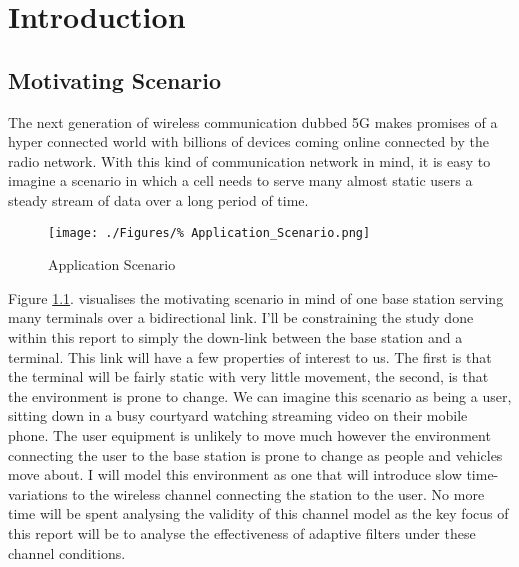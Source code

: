 \chapter{Introduction}
\label{ch:Introduction}
\section{Motivating Scenario}
\label{sec:MotivatingScenario}
The next generation of wireless communication %
dubbed 5G makes promises of a hyper connected %
world with billions of devices coming online %
connected by the radio network. With this kind %
of communication network in mind, it is easy %
to imagine a scenario in which a cell needs %
to serve many almost static users a steady stream %
of data over a long period of time.%

\begin{figure}[h!]
	\texttt{[image: ./Figures/\%
	Application\_Scenario.png]}
	\caption{Application Scenario}
	\label{fig:AppScene}
\end{figure}

Figure \ref{fig:AppScene}. visualises the motivating %
scenario in mind of one base station serving many %
terminals over a bidirectional link. I'll be constraining %
the study done within this report to simply the down-link %
between the base station and a terminal. This link will %
have a few properties of interest to us. The first is that %
the terminal will be fairly static with very little movement, %
the second, is that the environment is prone to change. We can %
imagine this scenario as being a user, sitting down in a busy %
courtyard watching streaming video on their mobile phone. The %
user equipment is unlikely to move much however the environment %
connecting the user to the base station is prone to change as %
people and vehicles move about. I will model this environment %
as one that will introduce slow time-variations to the wireless %
channel connecting the station to the user. No more time will be %
spent analysing the validity of this channel model as %
the key focus of this report will be to analyse the %
effectiveness of adaptive filters under these channel %
conditions.

